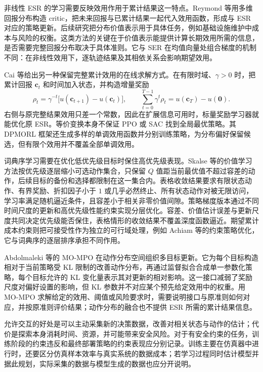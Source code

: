 非线性 ESR 的学习需要反映效用作用于累计结果这一特点。Reymond 等用多维回报分布构造 critic，把未来回报与已累计结果一起代入效用函数，形成与 ESR 对应的策略更新\cite{reymond2023}。后续研究把分布价值表示用于具体任务，例如基础设施维护中成本与风险的权衡\cite{remmerden2025}。这类方法的关键在于价值表示能提供计算长期效用所需的信息，是否需要完整回报分布取决于具体准则。它与 SER 在均值向量处组合梯度的机制不同：在非线性效用下，逐轨迹结果及其相依关系会影响期望效用。

Cai 等给出另一种保留完整累计效用的在线求解方式\cite{cai2023dpmorl}。在有限时域、$\gamma>0$ 时，把累计回报 $\mathbf c_t$ 和时间加入状态，并构造增量奖励
\begin{equation}
\rho_t=\gamma^{-t}\bigl[u(\mathbf c_{t+1})-u(\mathbf c_t)\bigr],
\qquad
\sum_{t=0}^{T-1}\gamma^t\rho_t=u(\mathbf c_T)-u(\mathbf0).
\end{equation}
右侧与原完整结果效用只差一个常数，因此在扩展信息可用时，标量奖励学习器就能优化原 ESR。等价变换本身不保证 PPO 或 SAC 找到全局最优策略。其 DPMORL 框架还生成多样的单调效用函数并分别训练策略，为分布偏好保留候选，但有限个效用并不覆盖全部单调效用。

词典序学习需要在优化低优先级目标时保住高优先级表现。Skalse 等的价值学习方法按优先级逐层缩小可选动作集合，只保留 $Q$ 值距当前最优值不超过容差的动作，后续目标的备份和选择都限制在这一集合内\cite{skalse2022}。表格收敛结果要求有限状态动作、有界奖励、折扣因子小于 $1$ 或几乎必然终止、所有状态动作对被无限访问，学习率满足随机逼近条件，且容差小于相关非零价值间隙。策略梯度版本通过不同时间尺度的更新和高优先级性能约束实现分层优化。容差、价值估计误差与更新尺度共同决定优先级能否保住，表格情形的收敛结果不覆盖深度函数逼近。期望累计成本约束则把可接受性作为独立的可行域处理，例如 Achiam 等的约束策略优化\cite{achiam2017}，它与词典序的逐层排序承担不同作用。

Abdolmaleki 等的 MO-MPO 在动作分布空间组织多目标更新\cite{abdolmaleki2020mompo}。它为每个目标构造相对于当前策略受 KL 限制的改善动作分布，再通过监督拟合合成单一参数化策略，每个目标允许的 KL 变化量表示其对更新的相对影响。这一接口减弱了奖励尺度对偏好设置的影响，但 KL 参数并不对应某个预先给定效用中的权重。用 MO-MPO 求解给定的效用、阈值或风险要求时，需要说明接口与原准则如何对应，并按原准则评价结果；动作分布的融合也不提供 ESR 所需的累计结果信息。

允许交互的好处是可以主动采集新的决策数据，改善对相关状态与动作的估计；代价是探索本身消耗时间、资源，并可能带来安全风险。对于有安全约束的任务，训练阶段的约束违反和最终部署策略的约束表现应分别记录\cite{skalse2022,achiam2017}。训练主要在仿真器中进行时，还要区分仿真样本效率与真实系统的数据成本；若学习过程同时估计模型并据此规划，实际采集的数据与模型生成的数据也应分开说明。

